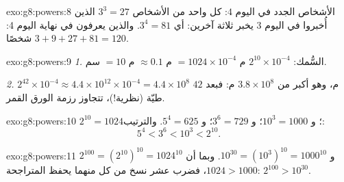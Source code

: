 \begin{solution}{exo:g8:powers:8}
الأشخاص الجدد في اليوم $4$: كل واحد من الأشخاص $3^3 = 27$ الذين أُخبروا في اليوم
3 يخبر ثلاثة آخرين: أي $3^4 = 81$. والذين يعرفون في نهاية اليوم 4:
$3 + 9 + 27 + 81 = 120$ شخصًا.
\end{solution}

\begin{solution}{exo:g8:powers:9}
\emph{1.} السُّمك: $2^{10} \times 10^{-4}$ م
$= 1024 \times 10^{-4}$ م $\approx 0.1$ م $= 10$ سم.

\emph{2.} $2^{42} \times 10^{-4} \approx 4.4 \times 10^{12} \times
10^{-4} = 4.4 \times 10^8$ م، وهو أكبر من $3.8 \times 10^8$ م: فبعد
$42$ طيّة (نظرية!)، تتجاوز رزمة الورق القمر.
\end{solution}

\begin{solution}{exo:g8:powers:10}
$2^{10} = 1024$؛ و $10^3 = 1000$؛ و $3^6 = 729$؛ و $5^4 = 625$. والترتيب:
\[
5^4 < 3^6 < 10^3 < 2^{10} .
\]
\end{solution}

\begin{solution}{exo:g8:powers:11}
$2^{100} = \left(2^{10}\right)^{10} = 1024^{10}$ و
$10^{30} = \left(10^3\right)^{10} = 1000^{10}$. وبما أن $1024 > 1000$،
فضرب عشر نسخ من كل منهما يحفظ المتراجحة:
$2^{100} > 10^{30}$.
\end{solution}

